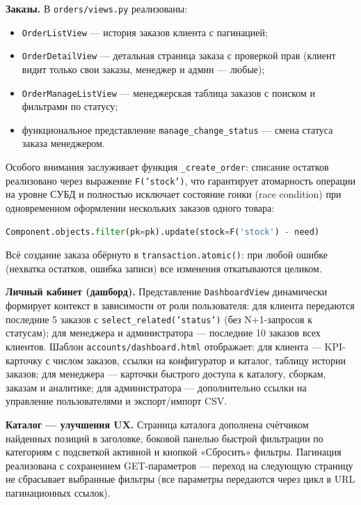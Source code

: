 \documentclass[14pt, a4paper]{extarticle}
\begin{document}
\textbf{Заказы.} В \texttt{orders/views.py} реализованы:
\begin{itemize}
    \item \texttt{OrderListView} --- история заказов клиента с пагинацией;
    \item \texttt{OrderDetailView} --- детальная страница заказа с проверкой прав (клиент видит только свои заказы, менеджер и админ --- любые);
    \item \texttt{OrderManageListView} --- менеджерская таблица заказов с поиском и фильтрами по статусу;
    \item функциональное представление \texttt{manage\_change\_status} --- смена статуса заказа менеджером.
\end{itemize}

Особого внимания заслуживает функция \texttt{\_create\_order}: списание остатков реализовано через выражение \texttt{F('stock')}, что гарантирует атомарность операции на уровне СУБД и полностью исключает состояние гонки (race condition) при одновременном оформлении нескольких заказов одного товара:

\begin{lstlisting}[language=Python, caption={Атомарное списание остатков через F()-выражение}]
Component.objects.filter(pk=pk).update(stock=F('stock') - need)
\end{lstlisting}

Всё создание заказа обёрнуто в \texttt{transaction.atomic()}: при любой ошибке (нехватка остатков, ошибка записи) все изменения откатываются целиком.

\textbf{Личный кабинет (дашборд).} Представление \texttt{DashboardView} динамически формирует контекст в зависимости от роли пользователя: для клиента передаются последние 5 заказов с \texttt{select\_related('status')} (без N+1-запросов к статусам); для менеджера и администратора --- последние 10 заказов всех клиентов. Шаблон \texttt{accounts/dashboard.html} отображает: для клиента --- KPI-карточку с числом заказов, ссылки на конфигуратор и каталог, таблицу истории заказов; для менеджера --- карточки быстрого доступа к каталогу, сборкам, заказам и аналитике; для администратора --- дополнительно ссылки на управление пользователями и экспорт/импорт CSV.

\textbf{Каталог --- улучшения UX.} Страница каталога дополнена счётчиком найденных позиций в заголовке, боковой панелью быстрой фильтрации по категориям с подсветкой активной и кнопкой «Сбросить» фильтры. Пагинация реализована с сохранением GET-параметров --- переход на следующую страницу не сбрасывает выбранные фильтры (все параметры передаются через цикл в URL пагинационных ссылок).
\end{document}
